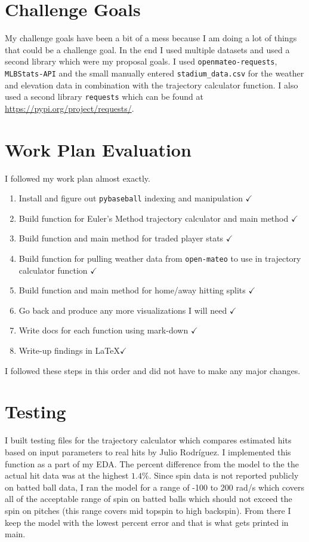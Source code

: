 \documentclass[11pt,twocolumn]{article}
\begin{document}
\section{Challenge Goals}
My challenge goals have been a bit of a mess because I am doing a lot of things that could be a challenge goal. In the end I used multiple datasets and used a second library which were my proposal goals. I used \texttt{openmateo-requests}, \texttt{MLBStats-API} and the small manually entered \texttt{stadium\_data.csv} for the weather and elevation data in combination with the trajectory calculator function. I also used a second library \texttt{requests} which can be found at \url{https://pypi.org/project/requests/}.

\section{Work Plan Evaluation}
I followed my work plan almost exactly. 

\begin{enumerate}
    \item Install and figure out \texttt{pybaseball} indexing and manipulation $\checkmark$
    \item Build function for Euler's Method trajectory calculator and main method $\checkmark$
    \item Build function and main method for traded player stats $\checkmark$
    \item Build function for pulling weather data from \texttt{open-mateo} to use in trajectory calculator function $\checkmark$
    \item Build function and main method for home/away hitting splits $\checkmark$
    \item Go back and produce any more visualizations I will need $\checkmark$
    \item Write docs for each function using mark-down $\checkmark$
    \item Write-up findings in \LaTeX $\checkmark$
\end{enumerate}
I followed these steps in this order and did not have to make any major changes.

\section{Testing}

I built testing files for the trajectory calculator which compares estimated hits based on input parameters to real hits by Julio Rodríguez. I implemented this function as a part of my EDA. The percent difference from the model to the the actual hit data was at the highest $1.4\%$. Since spin data is not reported publicly on batted ball data, I ran the model for a range of -100 to 200 rad/s which covers all of the acceptable range of spin on batted balls which should not exceed the spin on pitches (this range covers mid topspin to high backspin). From there I keep the model with the lowest percent error and that is what gets printed in main.
\end{document}
